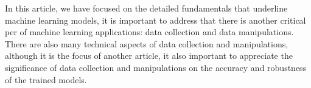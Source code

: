 
\par
In this article, we have focused on the detailed fundamentals that underline machine learning models, it is important to address that there is another critical per of machine learning applications: data collection and data manipulations. There are also many technical aspects of data collection and manipulations, although it is the focus of another article, it also important to appreciate the significance of data collection and manipulations on the accuracy and robustness of the trained models.
\par 
